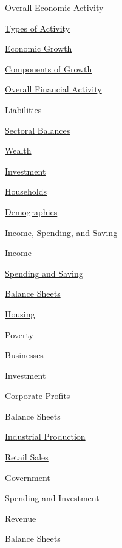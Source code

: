 \documentclass{report}
\begin{document}
\begin{minipage}{0.4\textwidth}
\begin{description}
\item {\hyperlink{oea}{Overall Economic Activity}}
\begin{description}
\item {\hyperlink{oety}{Types of Activity}}
\item {\hyperlink{oegr}{Economic Growth}}
\item {\hyperlink{oegc}{Components of Growth}}
\end{description}
\item {\hyperlink{ofa}{Overall Financial Activity}}
\begin{description}
\item {\hyperlink{ofl}{Liabilities}}
\item {\hyperlink{ofsb}{Sectoral Balances}}
\item {\hyperlink{ofw}{Wealth}}
\item {\hyperlink{ofi}{Investment}}
\end{description}
\item {\hyperlink{hh}{Households}}
\begin{description}
\item {\hyperlink{hhdem}{Demographics}}
\item {Income, Spending, and Saving}
\item {\hyperlink{hhinc}{Income}}
\item {\hyperlink{hhss}{Spending and Saving}}
\item {\hyperlink{hhbs}{Balance Sheets}}
\item {\hyperlink{hhh}{Housing}}
\item {\hyperlink{hhpov}{Poverty}}
\end{description}
\item {\hyperlink{bus}{Businesses}}
\begin{description}
\item {\hyperlink{busin}{Investment}}
\item {\hyperlink{buspr}{Corporate Profits}}
\item {Balance Sheets}
\item {\hyperlink{busip}{Industrial Production}}
\item {\hyperlink{busrs}{Retail Sales}}
\end{description}
\item {\hyperlink{gov}{Government}}
\begin{description}
\item Spending and Investment
\item Revenue
\item {\hyperlink{govbs}{Balance Sheets}}
\end{description}
\end{description}
\end{minipage} \hspace{10mm} 
\end{document}
